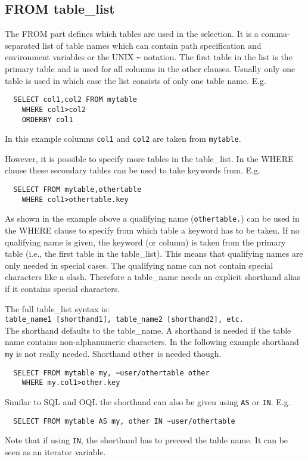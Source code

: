 \subsection{\label{TAQL:TABLE_LIST}FROM table\_list}
The FROM part defines which tables are used in the selection.
It is a comma-separated list of table names which can contain
path specification and environment variables or the UNIX
\verb+~+ notation.
The first table in the list is the primary
table and is used for all columns in the other clauses.
Usually only one table is used in which case the list consists
of only one table name. E.g.
\begin{verbatim}
  SELECT col1,col2 FROM mytable
    WHERE col1>col2
    ORDERBY col1
\end{verbatim}
In this example columns \texttt{col1} and \texttt{col2}
are taken from \texttt{mytable}.

However, it is possible to specify more tables in the table\_list.
In the WHERE clause these secondary tables can be used to take
keywords from. E.g.
\begin{verbatim}
  SELECT FROM mytable,othertable
    WHERE col1>othertable.key
\end{verbatim}
As shown in the example above a qualifying name (\verb+othertable.+)
can be used in the WHERE
clause to specify from which table a keyword has to be taken.
If no qualifying name is given, the keyword (or column) is taken
from the primary table (i.e., the first table in the table\_list).
This means that qualifying names are only needed in special cases.
The qualifying name can not contain special characters like a slash.
Therefore a table\_name needs an explicit shorthand alias
if it contains special characters.

The full table\_list syntax is:
\\
\texttt{table\_name1 [shorthand1], table\_name2 [shorthand2], etc.}
\\The shorthand defaults to the table\_name. A shorthand is needed if
the table name contains non-alphanumeric characters.
In the following example shorthand \texttt{my} is not really needed.
Shorthand \texttt{other} is needed though.
\begin{verbatim}
  SELECT FROM mytable my, ~user/othertable other
    WHERE my.col1>other.key
\end{verbatim}
Similar to SQL and OQL the shorthand can also be given using
\texttt{AS} or \texttt{IN}. E.g.
\begin{verbatim}
  SELECT FROM mytable AS my, other IN ~user/othertable
\end{verbatim}
Note that if using \texttt{IN}, the shorthand has to preceed
the table name. It can be seen as an iterator variable.

